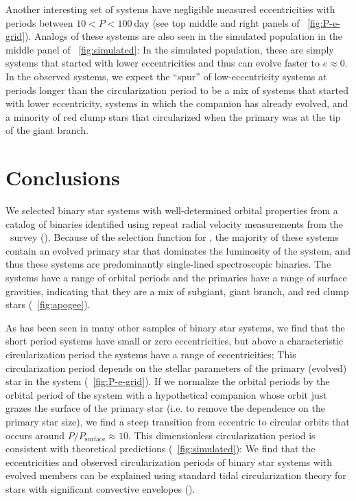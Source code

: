 \documentclass[modern, letterpaper]{aastex62}
\newcommand{\apogee}{\project{\acronym{APOGEE}}}
\newcommand{\Psurf}{\ensuremath{P_\textrm{surface}}}
\begin{document}
Another interesting set of systems have negligible measured eccentricities with
periods between $10 < P < 100~\textrm{day}$ (see top middle and right panels of
\figurename~\ref{fig:P-e-grid}).
Analogs of these systems are also seen in the simulated population in the middle
panel of \figurename~\ref{fig:simulated}: In the simulated population, these are
simply systems that started with lower eccentricities and thus can evolve faster
to $e \approx 0$.
In the observed systems, we expect the ``spur'' of low-eccentricity systems at
periods longer than the circularization period to be a mix of systems that
started with lower eccentricity, systems in which the companion has already
evolved, and a minority of red clump stars that circularized when the primary
was at the tip of the giant branch.


\section{Conclusions}

We selected binary star systems with well-determined orbital properties from a
catalog of binaries identified using repeat radial velocity measurements from
the \apogee\ survey (\citealt{Price-Whelan:2018}).
Because of the selection function for \apogee, the majority of these systems
contain an evolved primary star that dominates the luminosity of the system, and
thus these systems are predominantly single-lined spectroscopic binaries.
The systems have a range of orbital periods and the primaries have a range of
surface gravities, indicating that they are a mix of subgiant, giant branch, and
red clump stars (\figurename~\ref{fig:apogee}).

As has been seen in many other samples of binary star systems, we find that the
short period systems have small or zero eccentricities, but above a
characteristic circularization period the systems have a range of
eccentricities; This circularization period depends on the stellar parameters of
the primary (evolved) star in the system (\figurename~\ref{fig:P-e-grid}).
If we normalize the orbital periods by the orbital period of the system with a
hypothetical companion whose orbit just grazes the surface of the primary star
(i.e. to remove the dependence on the primary star size), we find a steep
transition from eccentric to circular orbits that occurs around $P / \Psurf
\approx 10$.
This dimensionless circularization period is consistent with theoretical
predictions (\figurename~\ref{fig:simulated}):
We find that the eccentricities and observed circularization periods of binary
star systems with evolved members can be explained using standard tidal
circularization theory for stars with significant convective envelopes
(\citealt{Zahn:1977, Zahn:1989, Verbunt:1995}).
\end{document}
